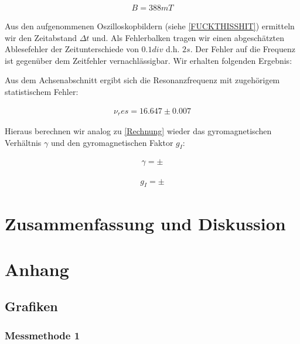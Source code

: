 \documentclass[12pt]{article}
\newcommand{\gra}[3][0.7]{
	\begin{minipage}[h!]{\textwidth}
		\centering
		\texttt{[image: figures/\#2.png]}
		\captionof{figure}{#3}
	\end{minipage}
	\vskip 30 pt
}
\begin{document}
\begin{align*}
B = 388 mT
\end{align*}


Aus den aufgenommenen Oszilloskopbildern (siehe \ref{FUCKTHISSHIT}) ermitteln wir den Zeitabstand $\Delta t$ und. Als Fehlerbalken tragen wir einen abgeschätzten Ablesefehler der Zeitunterschiede von $0.1 div$ d.h. $2s$. Der Fehler auf die Frequenz ist gegenüber dem Zeitfehler vernachlässigbar.
Wir erhalten folgenden Ergebnis:




Aus dem Achsenabschnitt ergibt sich die Resonanzfrequenz mit zugehörigem statistischem Fehler:

\begin{align*}
\nu_res = 16.647   \pm 0.007
\end{align*}   

Hieraus berechnen wir analog zu \ref{Rechnung} wieder das gyromagnetischen Verhältnis $\gamma$ und den gyromagnetischen Faktor $g_I$:

\begin{align*}
\gamma =  \pm
\end{align*}

\begin{align*}
g_I =   \pm
\end{align*}

\section{Zusammenfassung und Diskussion}


\newpage
\section{Anhang} 

\subsection{Grafiken}
\subsubsection{Messmethode 1}
\end{document}
